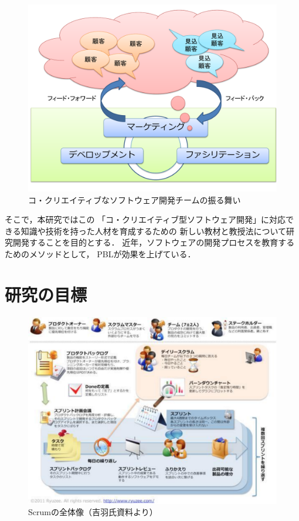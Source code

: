 \documentclass[a4j,9pt,twocolumn,twoside]{jsarticle}
\begin{document}
\begin{figure}
\begin{center}
\includegraphics[width=0.9\linewidth]{figs/CcSD.pdf}
\caption{コ・クリエイティブなソフトウェア開発チームの振る舞い}
\label{fig:CcSD}
\end{center}
\end{figure}
    
    そこで，本研究ではこの
    「コ・クリエイティブ型ソフトウェア開発」に対応できる知識や技術を持った人材を育成するための
    新しい教材と教授法について研究開発することを目的とする．
    近年，ソフトウェアの開発プロセスを教育するためのメソッドとして，
    PBLが効果を上げている\cite{pub:matsuzawa-2008}．
    

\section{研究の目標}\label{sec:method}
\begin{figure}
\begin{center}
\includegraphics[width=0.8\linewidth]{figs/scrum.pdf}
\caption{Scrumの全体像（吉羽氏資料より）}
\label{fig:scrum}
\end{center}
\end{figure}
\end{document}
